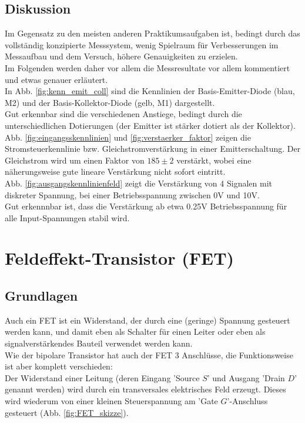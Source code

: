 \documentclass[12pt,a4paper]{article}
\begin{document}
\begin{multicols}{2}



\subsection{Diskussion}
Im Gegensatz zu den meisten anderen Praktikumsaufgaben ist, bedingt durch das vollständig konzipierte Messsystem, wenig Spielraum für Verbesserungen im Messaufbau und dem Versuch, höhere Genauigkeiten zu erzielen.\\
Im Folgenden werden daher vor allem die Messresultate vor allem kommentiert und etwas genauer erläutert.\\

In Abb. \ref{fig:kenn_emit_coll} sind die Kennlinien der Basis-Emitter-Diode (blau, M2) und der Basis-Kollektor-Diode (gelb, M1) dargestellt.\\
Gut erkennbar sind die verschiedenen Anstiege, bedingt durch die unterschiedlichen Dotierungen (der Emitter ist stärker dotiert als der Kollektor).\\

Abb. \ref{fig:eingangsskennlinien} und \ref{fig:verstaerker_faktor} zeigen die Stromsteuerkennlinie bzw. Gleichstromverstärkung in einer Emitterschaltung. Der Gleichstrom wird um einen Faktor von $185\pm 2$ verstärkt, wobei eine näherungsweise gute lineare Verstärkung nicht sofort eintritt.\\

Abb. \ref{fig:ausgangskennlinienfeld} zeigt die Verstärkung von 4 Signalen mit diskreter Spannung, bei einer Betriebsspannung zwischen 0V und 10V.\\
Gut erkennnbar ist, dass die Verstärkung ab etwa 0.25V Betriebsspannung für alle Input-Spannungen stabil wird.\\




\section{Feldeffekt-Transistor (FET)}

\subsection{Grundlagen}

Auch ein FET ist ein Widerstand, der durch eine (geringe) Spannung gesteuert werden kann, und damit eben als Schalter für einen Leiter oder eben als signalverstärkendes Bauteil verwendet werden kann.\\
Wie der bipolare Transistor hat auch der FET 3 Anschlüsse, die Funktionsweise ist aber komplett verschieden:\\
Der Widerstand einer Leitung (deren Eingang 'Source $S$' und Ausgang 'Drain $D$' genannt werden) wird durch ein transversales elektrisches Feld erzeugt. Dieses wird wiederum von einer kleinen Steuerspannung am 'Gate $G$'-Anschluss gesteuert (Abb. \ref{fig:FET_skizze}).


\end{multicols}
\end{document}
